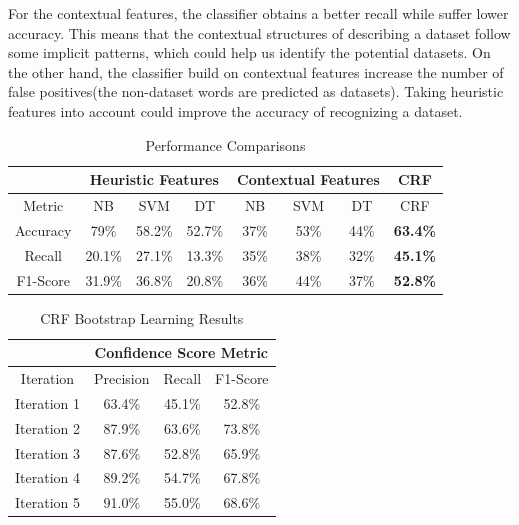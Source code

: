 \documentclass[10pt]{article}
\begin{document}
For the contextual features, the classifier obtains a better recall while suffer lower accuracy. This means that the contextual structures of describing a dataset follow some implicit patterns, which could help us identify the potential datasets. On the other hand, the classifier build on contextual features increase the number of false positives(the non-dataset words are predicted as datasets). Taking heuristic features into account could improve the accuracy of recognizing a dataset. 
\begin{table}
\centering
\hspace{-1cm}
\scriptsize
\vspace{0pt}
\begin{tabular}{|c @{\hskip 0.02in}| c c c @{\hskip 0.1in}| c c c @{\hskip 0.1in}| c |} %
	\hline %
	 & \multicolumn{3}{c|}{Heuristic Features} & \multicolumn{3}{c|}{Contextual Features} & \multicolumn{1}{c|}{CRF} \\
	\hline
	 Metric & NB & SVM & DT & NB & SVM & DT & CRF  \\ [0.2ex] %
	\hline \hline
	Accuracy & 79\% & 58.2\% & 52.7\% & 37\% & 53\% & 44\% & \textbf{63.4\%} \\
	\hline
	 Recall & 20.1\% & 27.1\% & 13.3\% & 35\% & 38\% & 32\% & \textbf{45.1\%} \\
	\hline
	F1-Score & 31.9\% & 36.8\% & 20.8\% & 36\% & 44\% & 37\% & \textbf{52.8\%} \\
	\hline %
	\end{tabular} 
	\caption{Performance Comparisons}
	\label{table:comparison} %
\end{table} 

\begin{table}
\centering
\hspace{-1cm}
\scriptsize
\vspace{0pt}
\begin{tabular}{|c @{\hskip 0.02in}| c | c | c |} %
	\hline %
	  & \multicolumn{3}{c|}{Confidence Score Metric} \\
	\hline %
	 Iteration & Precision & Recall & F1-Score  \\ [0.2ex] %
	\hline \hline
	Iteration 1 & 63.4\% & 45.1\%  & 52.8\%  \\
	\hline
	 Iteration 2 & 87.9\% & 63.6\% & 73.8\%  \\
	\hline
	Iteration 3 & 87.6\% &  52.8\% & 65.9\%  \\
	\hline
	Iteration 4 & 89.2\% & 54.7\% & 67.8\%  \\
	\hline
	Iteration 5 & 91.0\% & 55.0\% & 68.6\%  \\
	\hline
	\end{tabular} 
	\caption{CRF Bootstrap Learning Results}
	\label{table:bootstrap} %
\end{table} 
\end{document}
